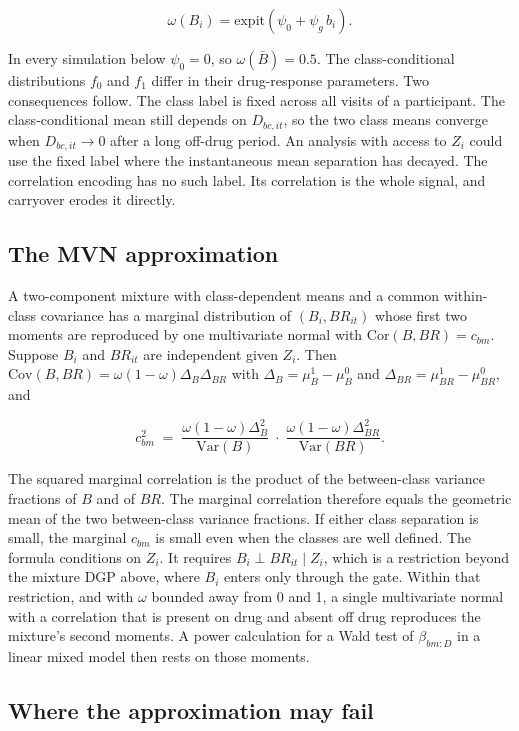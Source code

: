 \documentclass[
  11pt,
]{article}
\begin{document}
\[
\omega(B_i) = \mathrm{expit}(\psi_0 + \psi_g \, b_i).
\]

In every simulation below \(\psi_0 = 0\), so \(\omega(\bar B) = 0.5\).
The class-conditional distributions \(f_0\) and \(f_1\) differ in their
drug-response parameters. Two consequences follow. The class label is
fixed across all visits of a participant. The class-conditional mean
still depends on \(D_{bc,it}\), so the two class means converge when
\(D_{bc,it} \to 0\) after a long off-drug period. An analysis with
access to \(Z_i\) could use the fixed label where the instantaneous
mean separation has decayed. The correlation encoding has no such
label. Its correlation is the whole signal, and carryover erodes it
directly.

\subsection{The MVN approximation}\label{the-mvn-approximation}

A two-component mixture with class-dependent means and a common
within-class covariance has a marginal distribution of
\((B_i, BR_{it})\) whose first two moments are reproduced by one
multivariate normal with \(\mathrm{Cor}(B, BR) = c_{bm}\). Suppose \(B_i\)
and \(BR_{it}\) are independent given \(Z_i\). Then
\(\mathrm{Cov}(B, BR) = \omega(1-\omega)\Delta_B\Delta_{BR}\) with
\(\Delta_B = \mu_B^1 - \mu_B^0\) and \(\Delta_{BR} = \mu_{BR}^1 -
\mu_{BR}^0\), and

\[
c_{bm}^2 \;=\;
\frac{\omega(1-\omega)\Delta_B^2}{\mathrm{Var}(B)}
\;\cdot\;
\frac{\omega(1-\omega)\Delta_{BR}^2}{\mathrm{Var}(BR)}.
\]

The squared marginal correlation is the product of the between-class
variance fractions of \(B\) and of \(BR\). The marginal correlation
therefore equals the geometric mean of the two between-class variance
fractions. If either class separation is small, the marginal \(c_{bm}\)
is small even when the classes are well defined. The formula
conditions on \(Z_i\). It requires \(B_i \perp BR_{it} \mid Z_i\), which
is a restriction beyond the mixture DGP above, where \(B_i\) enters only
through the gate. Within that restriction, and with \(\omega\) bounded
away from 0 and 1, a single multivariate normal with a correlation
that is present on drug and absent off drug reproduces the mixture's
second moments. A power calculation for a Wald test of
\(\beta_{bm:D}\) in a linear mixed model then rests on those moments.

\subsection{Where the approximation may fail}\label{where-the-approximation-may-fail}
\end{document}
